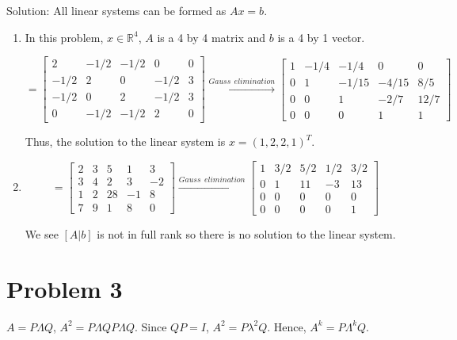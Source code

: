 \documentclass[12pt]{article}
\begin{document}
Solution:
All linear systems can be formed as $Ax = b$. 
\begin{enumerate}
\item
In this problem, $x \in \mathbb R^4$, $A$ is a 4 by 4 matrix and $b$ is a 4 by 1 vector.

\begin{equation*}
[A|b] = \begin{bmatrix}
2 & -1/2 & -1/2 & 0 & 0 \\
-1/2 & 2 & 0 & -1/2 & 3 \\
-1/2 & 0 & 2 & -1/2 & 3 \\
0 & -1/2 & -1/2 & 2 & 0 
\end{bmatrix} \xrightarrow {Gauss \ \ elimination}
\begin{bmatrix}
1 & -1/4 & -1/4 & 0 & 0 \\
0 & 1 & -1/15 & -4/15 & 8/5 \\
0 & 0 & 1 & -2/7 & 12/7 \\
0 & 0 & 0 & 1 & 1 
\end{bmatrix}
\end{equation*}

Thus, the solution to the linear system is $x = (1, 2, 2, 1)^T$.

\item
\begin{equation*}
[A|b] = \begin{bmatrix}
2 & 3 & 5 & 1 & 3 \\
3 & 4 & 2 & 3 & -2 \\
1 & 2 & 28 & -1 & 8 \\
7 & 9 & 1 & 8 & 0 
\end{bmatrix} \xrightarrow {Gauss \ \ elimination}
\begin{bmatrix}
1 & 3/2 & 5/2 & 1/2 & 3/2 \\
0 & 1 & 11 & -3 & 13 \\
0 & 0 & 0 & 0 & 0 \\
0 & 0 & 0 & 0 & 1 
\end{bmatrix}
\end{equation*}

We see $[A|b]$ is not in full rank so there is no solution to the linear system.
\end{enumerate}

\section{Problem 3}
$A = P\Lambda Q$, $A^2 = P\Lambda QP\Lambda Q$. Since $QP = I$, $A^2 = P \lambda^2 Q$. Hence, $A^k = P\Lambda ^k Q$. 
\end{document}

